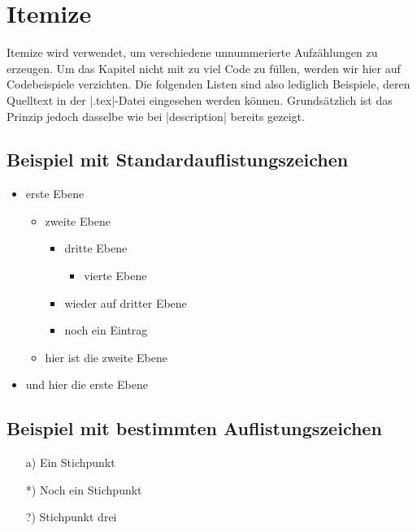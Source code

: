 \section{Itemize}
Itemize wird verwendet, um verschiedene unnummerierte Aufzählungen zu erzeugen. Um das Kapitel nicht mit zu viel Code zu füllen, werden wir hier auf Codebeispiele verzichten. Die folgenden Listen sind also lediglich Beispiele, deren Quelltext in der \befehl|.tex|-Datei eingesehen werden können. Grundsätzlich ist das Prinzip jedoch dasselbe wie bei \befehl|description| bereits gezeigt.

\subsection{Beispiel mit Standardauflistungszeichen}
\begin{itemize}
    \item erste Ebene
    \begin{itemize}
        \item zweite Ebene
        \begin{itemize}
            \item dritte Ebene
            \begin{itemize}
                \item vierte Ebene
            \end{itemize}
            \item wieder auf dritter Ebene 
            \item noch ein Eintrag 
        \end{itemize}
        \item hier ist die zweite Ebene
    \end{itemize}
    \item und hier die erste Ebene
\end{itemize}

\subsection{Beispiel mit bestimmten Auflistungszeichen}
\begin{itemize}
    \item[a)] Ein Stichpunkt
    \item[*)] Noch ein Stichpunkt
    \item[?)] Stichpunkt drei
\end{itemize}

